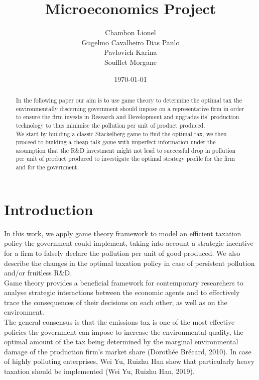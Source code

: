 \documentclass{article}
\title{Microeconomics Project}
\author{Chambon Lionel \\ Gugelmo Cavalheiro Dias Paulo \\ Pavlovich Karina \\ Soufflet Morgane}
\date{\today}
\begin{document}
\maketitle

\begin{abstract}
    In the following paper our aim is to use game theory to determine the optimal tax the environmentally discerning government should impose on a representative firm in order to ensure the firm invests in Research and Development and upgrades its' production technology to thus minimise the pollution per unit of product produced. \\

    We start by building a classic Stackelberg game to find the optimal tax, we then proceed to building a cheap talk game with imperfect information under the assumption that the R\&D investment might not lead to successful drop in pollution per unit of product produced to investigate the optimal strategy profile for the firm and for the government.  
\end{abstract}

\pagebreak
\tableofcontents
\pagebreak

\section{Introduction}

In this work, we apply game theory framework to model an efficient taxation policy the government could implement, taking into account a strategic incentive for a firm to falsely declare the pollution per unit of good produced. We also describe the changes in the optimal taxation policy in case of persistent pollution and/or fruitless R\&D. \\

Game theory provides a beneficial framework for contemporary researchers to analyse strategic interactions between the economic agents and to effectively trace the consequences of their decisions on each other, as well as on the environment. \\

The general consensus is that the emissions tax is one of the most effective policies the government can impose to increase the environmental quality, the optimal amount of the tax being determined by the marginal environmental damage of the production firm's market share (Dorothée Brécard, 2010). In case of highly polluting enterprises, Wei Yu, Ruizhu Han show that particularly heavy taxation should be implemented (Wei Yu, Ruizhu Han, 2019). \\
\end{document}
